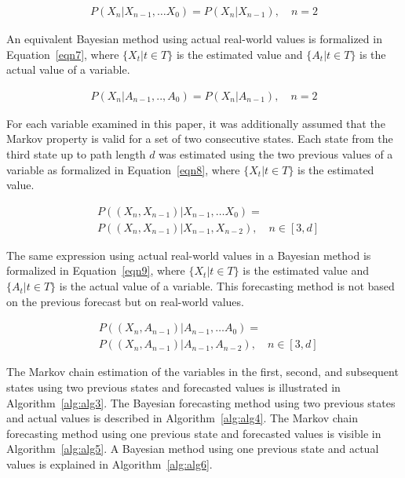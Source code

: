 \documentclass[preprint,12pt]{elsarticle}
\begin{document}
\begin{equation} \label{eqn6}
    \begin{aligned}
        P(X_{n}|X_{n-1}, \dots X_{0}) = P(X_{n}|X_{n-1}), \quad n = 2
    \end{aligned}
\end{equation}

An equivalent Bayesian method using actual real-world values is formalized in Equation~\ref{eqn7}, where $\{X_{t}|t\in T\}$ is the estimated value and $\{A_{t}|t\in T\}$ is the actual value of a variable.

\begin{equation} \label{eqn7}
    \begin{aligned}
        P(X_{n}|A_{n-1},..,A_{0}) = P(X_{n}|A_{n-1}), \quad n = 2
    \end{aligned}
\end{equation}

For each variable examined in this paper, it was additionally assumed that the Markov property is valid for a set of two consecutive states. Each state from the third state up to path length $d$ was estimated using the two previous values of a variable as formalized in Equation~\ref{eqn8}, where $\{X_{t}|t\in T\}$ is the estimated value.

\begin{equation} \label{eqn8}
    \begin{aligned}
        & P((X_{n},X_{n-1})|X_{n-1}, \dots X_{0}) = \\
        & P((X_{n},X_{n-1})|X_{n- 1},X_{n-2}), \quad n \in \left[3, d\right]
    \end{aligned}
\end{equation}

The same expression using actual real-world values in a Bayesian method is formalized in Equation~\ref{eqn9}, where $\{X_{t}|t\in T\}$ is the estimated value and $\{A_{t}|t\in T\}$ is the actual value of a variable. This forecasting method is not based on the previous forecast but on real-world values.

\begin{equation} \label{eqn9}
    \begin{aligned}
        & P((X_{n},A_{n-1})|A_{n-1}, \dots A_{0}) = \\
        & P((X_{n},A_{n-1})|A_{n- 1},A_{n-2}), \quad n \in \left[3, d\right]
    \end{aligned}
\end{equation}

The Markov chain estimation of the variables in the first, second, and subsequent states using two previous states and forecasted values is illustrated in Algorithm~\ref{alg:alg3}. The Bayesian forecasting method using two previous states and actual values is described in Algorithm~\ref{alg:alg4}. The Markov chain forecasting method using one previous state and forecasted values is visible in Algorithm~\ref{alg:alg5}. A Bayesian method using one previous state and actual values is explained in Algorithm~\ref{alg:alg6}.
\end{document}
